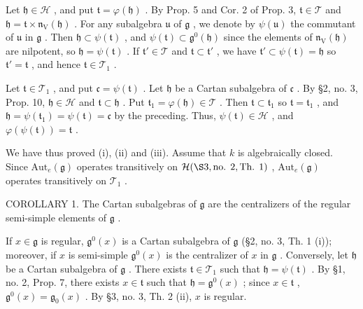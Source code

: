 Let \(\mathfrak{h} \in \mathcal{H}\) , and put \(\mathfrak{t} = \varphi(\mathfrak{h})\) . By Prop. 5 and Cor. 2 of Prop. 3, \(\mathfrak{t} \in \mathcal{T}\) and \(\mathfrak{h} = \mathfrak{t} \times \mathfrak{n}_{\mathrm{V}}(\mathfrak{h})\) . For any subalgebra \(\mathfrak{u}\) of \(\mathfrak{g}\) , we denote by \(\psi(\mathfrak{u})\) the commutant of \(\mathfrak{u}\) in \(\mathfrak{g}\) . Then \(\mathfrak{h} \subset \psi(\mathfrak{t})\) , and \(\psi(\mathfrak{t}) \subset \mathfrak{g}^0(\mathfrak{h})\) since the elements of \(\mathfrak{n}_{\mathrm{V}}(\mathfrak{h})\) are nilpotent, so \(\mathfrak{h} = \psi(\mathfrak{t})\) . If \(\mathfrak{t}' \in \mathcal{T}\) and \(\mathfrak{t} \subset \mathfrak{t}'\) , we have \(\mathfrak{t}' \subset \psi(\mathfrak{t}) = \mathfrak{h}\) so \(\mathfrak{t}' = \mathfrak{t}\) , and hence \(\mathfrak{t} \in \mathcal{T}_1\) .

Let \(\mathfrak{t} \in \mathcal{T}_1\) , and put \(\mathfrak{c} = \psi(\mathfrak{t})\) . Let \(\mathfrak{h}\) be a Cartan subalgebra of \(\mathfrak{c}\) . By §2, no. 3, Prop. 10, \(\mathfrak{h} \in \mathcal{H}\) and \(\mathfrak{t} \subset \mathfrak{h}\) . Put \(\mathfrak{t}_1 = \varphi(\mathfrak{h}) \in \mathcal{T}\) . Then \(\mathfrak{t} \subset \mathfrak{t}_1\) so \(\mathfrak{t} = \mathfrak{t}_1\) , and \(\mathfrak{h} = \psi(\mathfrak{t}_1) = \psi(\mathfrak{t}) = \mathfrak{c}\) by the preceding. Thus, \(\psi(\mathfrak{t}) \in \mathcal{H}\) , and \(\varphi(\psi(\mathfrak{t})) = \mathfrak{t}\) .

We have thus proved (i), (ii) and (iii). Assume that \(k\) is algebraically closed. Since \(\mathrm{Aut}_e(\mathfrak{g})\) operates transitively on \(\mathcal{H}(\S 3, \text{no. } 2, \text{Th. } 1)\) , \(\mathrm{Aut}_e(\mathfrak{g})\) operates transitively on \(\mathcal{T}_1\) .

COROLLARY 1. The Cartan subalgebras of \(\mathfrak{g}\) are the centralizers of the regular semi-simple elements of \(\mathfrak{g}\) .

If \(x \in \mathfrak{g}\) is regular, \(\mathfrak{g}^0(x)\) is a Cartan subalgebra of \(\mathfrak{g}\) (§2, no. 3, Th. 1 (i)); moreover, if \(x\) is semi-simple \(\mathfrak{g}^0(x)\) is the centralizer of \(x\) in \(\mathfrak{g}\) . Conversely, let \(\mathfrak{h}\) be a Cartan subalgebra of \(\mathfrak{g}\) . There exists \(\mathfrak{t} \in \mathcal{T}_1\) such that \(\mathfrak{h} = \psi(\mathfrak{t})\) . By §1, no. 2, Prop. 7, there exists \(x \in \mathfrak{t}\) such that \(\mathfrak{h} = \mathfrak{g}^0(x)\) ; since \(x \in \mathfrak{t}\) , \(\mathfrak{g}^0(x) = \mathfrak{g}_0(x)\) . By §3, no. 3, Th. 2 (ii), \(x\) is regular.

